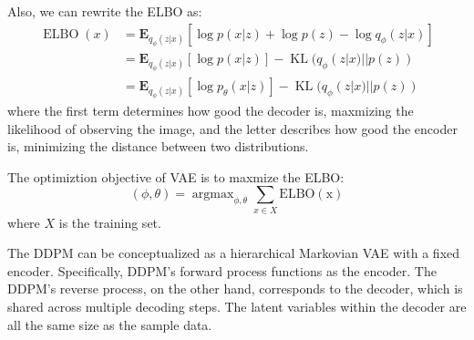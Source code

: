 \begin{theorem}
    Also, we can rewrite the ELBO as:
    \begin{equation}
        \begin{aligned}
            \operatorname{ELBO}(x) &= \mathbf{E}_{q_\phi(z|x)}\left[\log p(x|z)+\log p(z)-\log q_\phi(z|x)\right]\\
            &= \mathbf{E}_{q_\phi(z|x)}\left[\log p(x|z)\right] - \operatorname{KL}(q_\phi(z|x)||p(z))\\
            &= \mathbf{E}_{q_\phi(z|x)}\left[\log p_\theta(x|z)\right] - \operatorname{KL}(q_\phi(z|x)||p(z))
        \end{aligned}
    \end{equation}
    where the first term determines how good the decoder is, maxmizing the likelihood of observing the image, 
    and the letter describes how good the encoder is, minimizing the distance between two distributions.
\end{theorem}

\begin{definition}
    The optimiztion objective of VAE is to maxmize the ELBO:
    \begin{equation}
        (\phi, \theta) = \operatorname{argmax}_{\phi, \theta} \sum_{x\in X} \operatorname{ELBO(x)}
    \end{equation}
    where $X$ is the training set.
\end{definition}
The DDPM can be conceptualized as a hierarchical Markovian VAE with a fixed encoder. Specifically, DDPM's  forward process functions as the encoder.
The DDPM’s reverse process, on the other hand, corresponds to the decoder, which is shared across multiple  decoding steps. The latent variables within the decoder are all the same size as the sample data.




